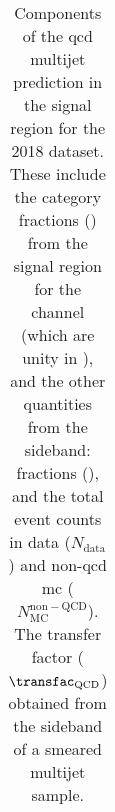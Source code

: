 \begin{table}[htbp]
\begin{tabular*}{\linewidth}{@{\extracolsep{\fill}}llclcccr}
\bottomrule
\end{tabular*}
\caption[Components of the \acrshort{qcd} multijet prediction in the signal region for the 2018 dataset]{Components of the \acrshort{qcd} multijet prediction in the signal region for the 2018 dataset. These include the category fractions (\catFraction) from the signal region for the \ttH channel (which are unity in \VH), and the other quantities from the sideband: \ptmiss fractions (\metFraction), and the total event counts in data ($N_{\mathrm{data}}$) and non-\acrshort{qcd} \acrshort{mc} ($N_{\mathrm{MC}}^{\mathrm{non-QCD}}$). The transfer factor ($\transfac_{\mathrm{QCD}}$) obtained from the sideband of a smeared multijet sample.}
\label{tab:htoinv_qcd_pred_2018}
\end{table}

